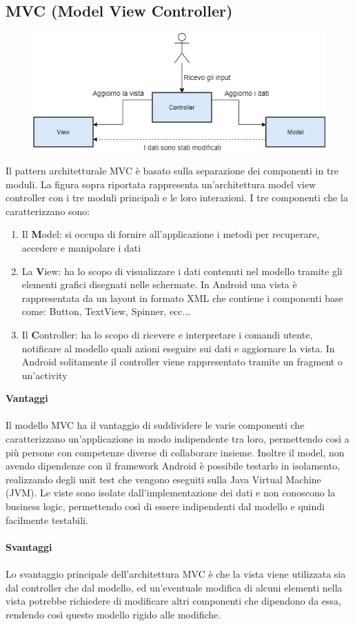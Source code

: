 \documentclass[12pt]{report}
\begin{document}
\subsection{MVC (Model View Controller)}
\begin{figure}[H]
	\centering
	\includegraphics[width=0.7\linewidth]{immagini/mvc}
	\caption{}
	\label{fig:mvc}
\end{figure}
Il pattern architetturale MVC è basato sulla separazione dei componenti in tre moduli. La figura sopra riportata rappresenta un'architettura model view controller con i tre moduli principali e le loro interazioni. I tre componenti che la caratterizzano sono: 
\begin{enumerate}
	\item Il \textbf{M}odel: si occupa di fornire all'applicazione i metodi per recuperare, accedere e manipolare i dati
	\item La \textbf{V}iew: ha lo scopo di visualizzare i dati contenuti nel modello tramite gli elementi grafici disegnati nelle schermate. In Android una vista è rappresentata da un layout in formato XML che contiene i componenti base come: Button, TextView, Spinner, ecc...
	\item Il \textbf{C}ontroller: ha lo scopo di ricevere e interpretare i comandi utente, notificare al modello quali azioni eseguire sui dati e aggiornare la vista. In Android solitamente il controller viene rappresentato tramite un fragment o un'activity
\end{enumerate}
\newpage
\noindent
\textbf{Vantaggi}\\\\
Il modello MVC ha il vantaggio di suddividere le varie componenti che caratterizzano un'applicazione in modo indipendente tra loro, permettendo così a più persone con competenze diverse di collaborare insieme. Inoltre il model, non avendo dipendenze con il framework Android è possibile testarlo in isolamento, realizzando degli unit test che vengono eseguiti sulla Java Virtual Machine (JVM). Le viste sono isolate dall'implementazione dei dati e non conoscono la business logic, permettendo così di essere indipendenti dal modello e quindi facilmente testabili.\\
\\\textbf{Svantaggi}\\\\
Lo svantaggio principale dell'architettura MVC è che la vista viene utilizzata sia dal controller che dal modello, ed un'eventuale modifica di alcuni elementi nella vista potrebbe richiedere di modificare altri componenti che dipendono da essa, rendendo così questo modello rigido alle modifiche.
\end{document}
